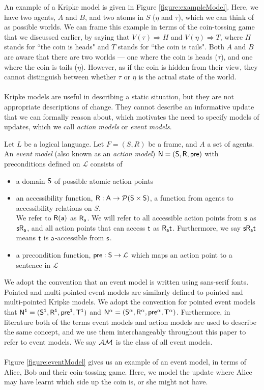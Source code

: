 An example of a Kripke model is given in Figure \ref{figure:exampleModel}.
Here, we have two agents, $A$ and $B$, and two atoms in $S$ ($\eta$ and $\tau$), which we can think
of as possible worlds.
We can frame this example in terms of the coin-tossing game that we discussed earlier, by saying
that $V(\tau) \Rightarrow H$ and $V(\eta) \Rightarrow T$, where $H$ stands for ``the coin is heads"
and $T$ stands for ``the coin is tails".
Both $A$ and $B$ are aware that there are two worlds --- one where the coin is heads ($\tau$), and one
where the coin is tails ($\eta$).
However, as if the coin is hidden from their view, they cannot distinguish between whether $\tau$ or
$\eta$ is the actual state of the world.\\
\\
Kripke models are useful in describing a static situation, but they are not appropriate descriptions
of change.
They cannot describe an informative update that we can formally reason about, which motivates the
need to specify models of updates, which we call {\em action models} or {\em event models}.

\begin{defn} \label{evModel}
	Let $L$ be a logical language.
	Let $F = (S, R)$ be a frame, and $A$ a set of agents.
	An {\em event model} (also known as an {\em action model}) $\mathrm{\mathsf{\mathrm{\mathsf{N}} = (S, R, pre)}}$ with preconditions defined on $\mathcal{L}$ consists of
	\begin{itemize}
		\item a domain $\mathrm{\mathsf{S}}$ of possible atomic action points
		\item an accessibility function, $\mathrm{\mathsf{R: A \to \mathcal{P}(S \times
        S)}}$, a function from agents to
		accessibility relations on $S$.\\
		We refer to $\mathrm{\mathsf{R(a)}}$ as $\mathrm{\mathsf{R_a}}$.
		We will refer to all accessible action points from $\mathrm{\mathsf{s}}$ as
    $\mathrm{\mathsf{s R_a}}$, and all action points that
		can access $\mathrm{\mathsf{t}}$ as $\mathrm{\mathsf{R_a t}}$.
		Furthermore, we say $\mathrm{\mathsf{s R_a t}}$ means $\mathrm{\mathsf{t}}$ is
    $\mathrm{\mathsf{a}}$-accessible from $\mathrm{\mathsf{s}}$.
		\item a precondition function, $\mathrm{\mathsf{pre: S}} \to \mathcal{L}$ which maps an action point to a
		sentence in $\mathcal{L}$
	\end{itemize}
\end{defn}

We adopt the convention that an event model is written using sans-serif fonts.
Pointed and multi-pointed event models are similarly defined to pointed and multi-pointed Kripke
models.
We adopt the convention for pointed event models that $\mathrm{\mathsf{\mathrm{\mathsf{N}}^1 = (S^1, R^1,
pre^1, T^1)}}$ and $\mathrm{\mathsf{\mathrm{\mathsf{N}}^\alpha =
  (S^\alpha,R^\alpha,pre^\alpha,T^\alpha)}}$.
Furthermore, in literature both of the terms event models and action models are used to describe
the same concept, and we use them interchangeably throughout this paper to refer to event models.
We say $\mathcal{AM}$ is the class of all event models.\\
\\
Figure \ref{figure:eventModel} gives us an example of an event model, in terms of Alice, Bob and
their coin-tossing game.
Here, we model the update where Alice may have learnt which side up the coin is, or she might not have.


